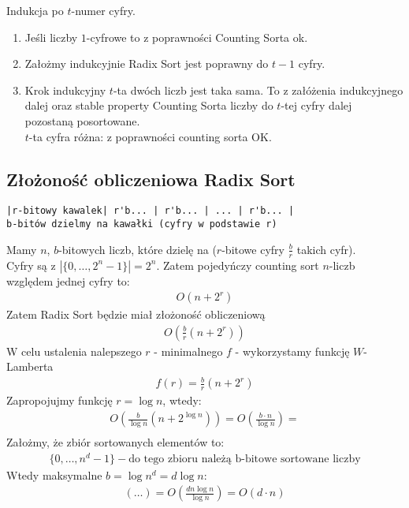 \documentclass{article}
\numberwithin{equation}{subsection}
\begin{document}
Indukcja po $t$-numer cyfry.
\begin{enumerate}
    \item Jeśli liczby $1$-cyfrowe to z poprawności Counting Sorta ok.
    \item Założmy indukcyjnie Radix Sort jest poprawny do $t-1$ cyfry.
    \item Krok indukcyjny $t$-ta dwóch liczb jest taka sama. To z załóżenia indukcyjnego dalej oraz stable property Counting Sorta liczby do $t$-tej cyfry dalej pozostaną posortowane.\\
    $t$-ta cyfra różna: z poprawności counting sorta OK.
\end{enumerate}

\subsection{Złożoność obliczeniowa Radix Sort}

\begin{verbatim}
|r-bitowy kawalek| r'b... | r'b... | ... | r'b... |
b-bitów dzielmy na kawałki (cyfry w podstawie r)
\end{verbatim}
Mamy $n$, $b$-bitowych liczb, które dzielę na ($r$-bitowe cyfry $\frac{b}{r}$ takich cyfr).\\
Cyfry są z $|\{0,\dots,2^n -1\}| = 2^n$.
Zatem pojedyńczy counting sort $n$-liczb względem jednej cyfry to:
\begin{align}
    O(n + 2^r)
\end{align}
Zatem Radix Sort będzie miał złożoność obliczeniową
\begin{align}
    O\left(\frac{b}{r} (n + 2^r)\right)
\end{align}
W celu ustalenia nalepszego $r$ - minimalnego $f$ - wykorzystamy funkcję $W$-Lamberta
\begin{align}
    f(r) = \frac{b}{r}\left(n + 2^r\right)
\end{align}
Zapropojujmy funkcję $r=\log n$, wtedy:
\begin{align}
    O\left(\frac{b}{\log n} \left(n + 2^{\log n}\right)\right) = O\left(\frac{b\cdot n}{\log n}\right)=\\
\end{align}
Założmy, że zbiór sortowanych elementów to:
\begin{align}
    \{0,\dots,n^d-1\} - \text{do tego zbioru należą b-bitowe sortowane liczby}
\end{align}
Wtedy maksymalne $b=\log n^d = d \log n$:
\begin{align}
    (\dots) = O\left(\frac{d n \log n}{\log n}\right) = O(d\cdot n)  
\end{align}
\end{document}
